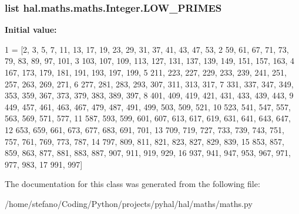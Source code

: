 \subsubsection[{\texorpdfstring{L\+O\+W\+\_\+\+P\+R\+I\+M\+ES}{LOW_PRIMES}}]{\setlength{\rightskip}{0pt plus 5cm}list hal.\+maths.\+maths.\+Integer.\+L\+O\+W\+\_\+\+P\+R\+I\+M\+ES\hspace{0.3cm}{\ttfamily [static]}}\hypertarget{classhal_1_1maths_1_1maths_1_1_integer_a96c3647159f9eb8631f519bd088b8eda}{}\label{classhal_1_1maths_1_1maths_1_1_integer_a96c3647159f9eb8631f519bd088b8eda}
{\bfseries Initial value\+:}
\begin{DoxyCode}
1 = [2, 3, 5, 7, 11, 13, 17, 19, 23, 29, 31, 37, 41, 43, 47, 53,
2                   59, 61, 67, 71, 73, 79, 83, 89, 97, 101,
3                   103, 107, 109, 113, 127, 131, 137, 139, 149, 151, 157, 163,
4                   167, 173, 179, 181, 191, 193, 197, 199,
5                   211, 223, 227, 229, 233, 239, 241, 251, 257, 263, 269, 271,
6                   277, 281, 283, 293, 307, 311, 313, 317,
7                   331, 337, 347, 349, 353, 359, 367, 373, 379, 383, 389, 397,
8                   401, 409, 419, 421, 431, 433, 439, 443,
9                   449, 457, 461, 463, 467, 479, 487, 491, 499, 503, 509, 521,
10                   523, 541, 547, 557, 563, 569, 571, 577,
11                   587, 593, 599, 601, 607, 613, 617, 619, 631, 641, 643, 647,
12                   653, 659, 661, 673, 677, 683, 691, 701,
13                   709, 719, 727, 733, 739, 743, 751, 757, 761, 769, 773, 787,
14                   797, 809, 811, 821, 823, 827, 829, 839,
15                   853, 857, 859, 863, 877, 881, 883, 887, 907, 911, 919, 929,
16                   937, 941, 947, 953, 967, 971, 977, 983,
17                   991, 997]
\end{DoxyCode}


The documentation for this class was generated from the following file\+:\begin{DoxyCompactItemize}
\item 
/home/stefano/\+Coding/\+Python/projects/pyhal/hal/maths/maths.\+py\end{DoxyCompactItemize}
